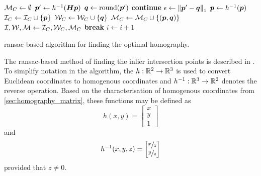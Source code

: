 \documentclass[../report.tex]{subfiles}
\begin{document}
\begin{algorithm}
\begin{algorithmic}[1]
                    \State ${\mathcal{M}}_C \gets \emptyset$ 
                    \ForAll{$\vp \in \sP$}
                        \label{alg:ransac:for_loop_over_all_points}
                        \State ${\bm{p}}' \gets h^{-1}({\bm{H}} {\bm{p}})$ 
                        \label{alg:ransac:warp}
                        \State ${\bm{q}} \gets \text{round}({\bm{p}}')$ 
                         
                            \State \textbf{continue}
                        \EndIf
                        \State $\epsilon \gets \left\lVert{\bm{p}}' - {\bm{q}}\right\rVert_1$ \label{alg:ransac:error}
                         
                            \State ${\bm{p}} \gets h^{-1}({\bm{p}})$
                            \State ${\mathcal{I}}_C \gets {\mathcal{I}}_C \cup \{{\bm{p}}\}$ 
                            \State ${\mathcal{W}}_C \gets {\mathcal{W}}_C \cup \{{\bm{q}}\}$
                            \State ${\mathcal{M}}_C \gets {\mathcal{M}}_C \cup \{({\bm{p}}, {\bm{q}})\}$
                        \EndIf
                    \EndFor
                     
                        \State ${\mathcal{I}},{\mathcal{W}},{\mathcal{M}} \gets {\mathcal{I}}_C,{\mathcal{W}}_C,{\mathcal{M}}_C$
                    \EndIf
                \EndFor
            \EndFor
                \textbf{break}
            \EndIIf {}
            \State $i \gets i + 1$
        \EndWhile
    \end{algorithmic}
    \caption{\acs{ransac}-based algorithm for finding the optimal homography.}
    \label{alg:ransac}
\end{algorithm}
The \gls{ransac}-based method of finding the inlier intersection points is described in . 
To simplify notation in the algorithm, the $h : \mathbb{R}^2 \to \mathbb{R}^3$ is used to convert Euclidean coordinates to homogenous coordinates and $h^{-1} : \mathbb{R}^3 \to \mathbb{R}^2$ denotes the reverse operation.
Based on the characterisation of homogenous coordinates from \cref{sec:homography_matrix}, these functions may be defined as
\begin{equation*}
    h(x,y) = \begin{bmatrix}
        x\\y\\1
    \end{bmatrix}
\end{equation*}
and
\begin{equation*}
    h^{-1}(x,y,z) = \begin{bmatrix}
        \sfrac{x}{z}\\
        \sfrac{y}{z}
    \end{bmatrix}
\end{equation*}
provided that $z \neq 0$.
\end{document}
